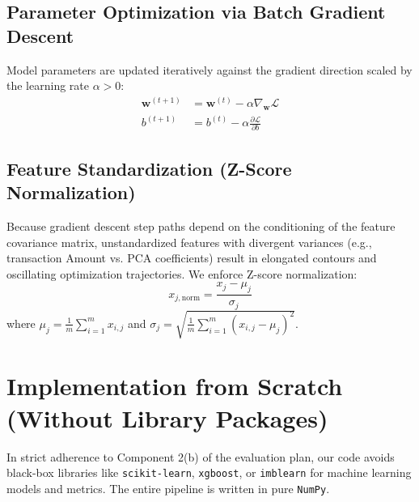 \documentclass[11pt,a4paper]{article}
\begin{document}
\subsection{Parameter Optimization via Batch Gradient Descent}
Model parameters are updated iteratively against the gradient direction scaled by the learning rate $\alpha > 0$:
\begin{align}
    \mathbf{w}^{(t+1)} &= \mathbf{w}^{(t)} - \alpha \nabla_{\mathbf{w}} \mathcal{L} \\
    b^{(t+1)} &= b^{(t)} - \alpha \frac{\partial \mathcal{L}}{\partial b}
\end{align}

\subsection{Feature Standardization (Z-Score Normalization)}
Because gradient descent step paths depend on the conditioning of the feature covariance matrix, unstandardized features with divergent variances (e.g., transaction Amount vs. PCA coefficients) result in elongated contours and oscillating optimization trajectories. We enforce Z-score normalization:
\begin{equation}
    x_{j,\text{norm}} = \frac{x_j - \mu_j}{\sigma_j}
\end{equation}
where $\mu_j = \frac{1}{m} \sum_{i=1}^m x_{i,j}$ and $\sigma_j = \sqrt{\frac{1}{m} \sum_{i=1}^m (x_{i,j} - \mu_j)^2}$.

\section{Implementation from Scratch (Without Library Packages)}
\label{sec:implementation}

In strict adherence to Component 2(b) of the evaluation plan, our code avoids black-box libraries like \texttt{scikit-learn}, \texttt{xgboost}, or \texttt{imblearn} for machine learning models and metrics. The entire pipeline is written in pure \texttt{NumPy}.
\end{document}
